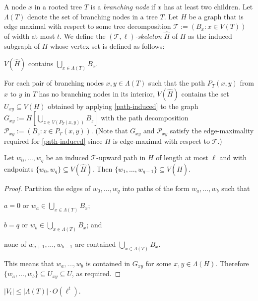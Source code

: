 \documentclass[kpfonts]{patmorin}
\theoremstyle{named}
\begin{document}
A node $x$ in a rooted tree $T$ is a \emph{branching node} if $x$ has at least two children.  Let $\Lambda(T)$ denote the set of branching nodes in a tree $T$.  Let $H$ be a graph that is edge maximal with respect to some tree decomposition $\mathcal{T}:=(B_x:x\in V(T))$ of width at most $t$. We define the \emph{$(\mathcal{T},\ell)$-skeleton} $\hat{H}$ of $H$ as the induced subgraph of $H$ whose vertex set is defined as follows:
\begin{compactenum}
    \item $V(\hat{H})$ contains $\bigcup_{x\in\Lambda(T)} B_x$.

    \item For each pair of branching nodes $x,y\in\Lambda(T)$ such that the path $P_T(x,y)$ from $x$ to $y$ in $T$ has no branching nodes in its interior, $V(\hat{H})$ contains the set $U_{xy}\subseteq V(H)$ obtained by applying \cref{path-induced} to the graph $G_{xy}:=H[\bigcup_{z\in V(P_T(x,y))} B_z]$ with the path decomposition $\mathcal{P}_{xy}:=(B_z:z\in P_T(x,y))$.  (Note that $G_{xy}$ and $\mathcal{P}_{xy}$ satisfy the edge-maximality required for \cref{path-induced} since $H$ is edge-maximal with respect to $\mathcal{T}$.)
\end{compactenum}


\begin{lem}\label{skeleton-paths}
    Let $w_0,\ldots,w_q$ be an induced $\mathcal{T}$-upward path in $H$ of length at most $\ell$ and with endpoints $\{w_0,w_q\}\subseteq V(\hat{H})$. Then $\{w_1,\ldots,w_{q-1}\}\subseteq V(\hat{H})$.
\end{lem}

\begin{proof}
    Partition the edges of $w_0,\ldots,w_q$ into paths of the form $w_a,\ldots,w_b$ such that
    \begin{inparaenum}[(i)]
        \item $a=0$ or $w_a\in\bigcup_{x\in \Lambda(T)} B_x$;
        \item $b=q$ or $w_b\in\bigcup_{x\in \Lambda(T)} B_x$; and
        \item none of $w_{a+1},\ldots,w_{b-1}$ are contained $\bigcup_{x\in \Lambda(T)} B_x$.
    \end{inparaenum}
    This means that $w_a,\ldots,w_b$ is contained in $G_{xy}$ for some $x,y\in \Lambda(H)$.  Therefore $\{w_a,\ldots,w_b\}\subseteq U_{xy}\subseteq U$, as required.
\end{proof}


\begin{lem}\label{skeleton-size}
    $|V_t|\le |\Lambda(T)|\cdot O(\ell^t)$.
\end{lem}
\end{document}
